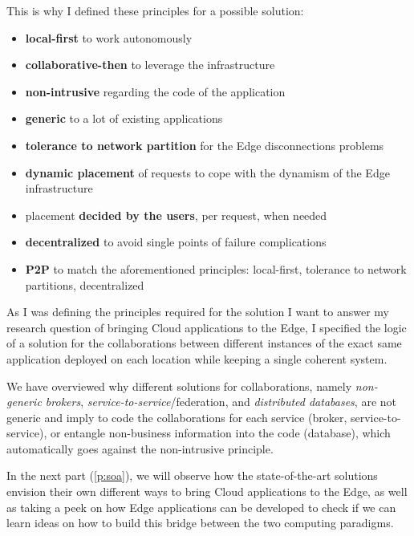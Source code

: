 This is why I defined these principles for a possible solution:
  \begin{itemize}
  \item \textbf{local-first} to work autonomously
  \item \textbf{collaborative-then} to leverage the infrastructure
  \item \textbf{non-intrusive} regarding the code of the application
  \item \textbf{generic} to a lot of existing applications
  \item \textbf{tolerance to network partition} for the Edge
    disconnections problems
  \item \textbf{dynamic placement} of requests to cope with the
    dynamism of the Edge infrastructure
  \item placement \textbf{decided by the users}, per request, when
    needed
  \item \textbf{decentralized} to avoid single points of failure
    complications
  \item \textbf{P2P} to match the aforementioned principles:
    local-first, tolerance to network partitions, decentralized
  \end{itemize}

  As I was defining the principles required for the solution I want to
  answer my research question of bringing Cloud applications to the
  Edge, I specified the logic of a solution for the collaborations
  between different instances of the exact same application deployed
  on each location while keeping a single coherent system.

  We have overviewed why different solutions for collaborations,
  namely \emph{non-generic brokers},
  \emph{service-to-service}/federation, and \emph{distributed
    databases}, are not generic and imply to code the collaborations
  for each service (broker, service-to-service), or entangle
  non-business information into the code (database), which
  automatically goes against the non-intrusive principle.

  In the next part (\autoref{p:soa}), we will observe how the
  state-of-the-art solutions envision their own different ways to
  bring Cloud applications to the Edge, as well as taking a peek on
  how Edge applications can be developed to check if we can learn
  ideas on how to build this bridge between the two computing
  paradigms.
